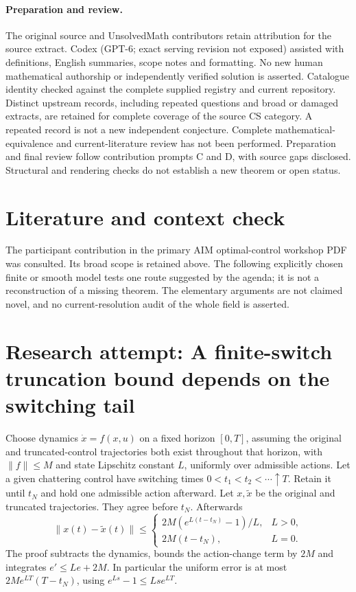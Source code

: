 \documentclass[11pt]{article}
\begin{document}
\paragraph{Preparation and review.}
The original source and UnsolvedMath contributors retain attribution for the source extract. Codex (GPT-6; exact serving revision not exposed) assisted with definitions, English summaries, scope notes and formatting. No new human mathematical authorship or independently verified solution is asserted. Catalogue identity checked against the complete supplied registry and current repository. Distinct upstream records, including repeated questions and broad or damaged extracts, are retained for complete coverage of the source CS category. A repeated record is not a new independent conjecture. Complete mathematical-equivalence and current-literature review has not been performed. Preparation and final review follow contribution prompts C and D, with source gaps disclosed. Structural and rendering checks do not establish a new theorem or open status.
\label{end:statement}

\section{Literature and context check}
The participant contribution in the primary AIM optimal-control workshop
 PDF was consulted. Its broad scope is retained above. The following explicitly
 chosen finite or smooth model tests one route suggested by the agenda; it is
 not a reconstruction of a missing theorem. The elementary arguments are not
 claimed novel, and no current-resolution audit of the whole field is asserted.
\section{Research attempt: A finite-switch truncation bound depends on the switching tail}
Choose dynamics $\dot x=f(x,u)$ on a fixed horizon $[0,T]$, assuming the
original and truncated-control trajectories both exist throughout that horizon, with
$\|f\|\le M$ and state Lipschitz constant $L$, uniformly over admissible
actions. Let a given chattering control have switching times
$0<t_1<t_2<\cdots\uparrow T$. Retain it until $t_N$ and hold one admissible
action afterward. Let $x,\widetilde x$ be the original and truncated trajectories.
They agree before $t_N$. Afterwards
\[
 \|x(t)-\widetilde x(t)\|\le
 \begin{cases}2M(e^{L(t-t_N)}-1)/L,&L>0,\\2M(t-t_N),&L=0.\end{cases}
\]
The proof subtracts the dynamics, bounds the action-change term by $2M$ and
integrates $e'\le Le+2M$. In particular the uniform error is at most
$2Me^{LT}(T-t_N)$, using $e^{Ls}-1\le Lse^{LT}$.
\end{document}
